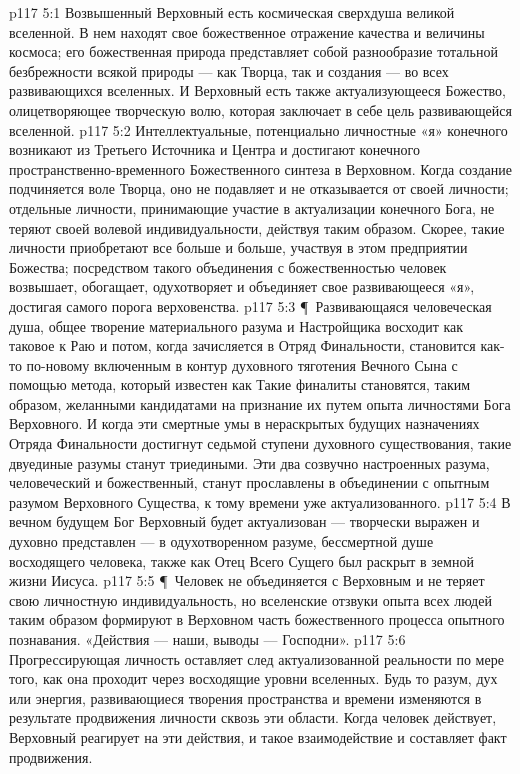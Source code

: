 \vs p117 5:1 Возвышенный Верховный есть космическая сверхдуша великой вселенной. В нем находят свое божественное отражение качества и величины космоса; его божественная природа представляет собой разнообразие тотальной безбрежности всякой природы --- как Творца, так и создания --- во всех развивающихся вселенных. И Верховный есть также актуализующееся Божество, олицетворяющее творческую волю, которая заключает в себе цель развивающейся вселенной.
\vs p117 5:2 Интеллектуальные, потенциально личностные «я» конечного возникают из Третьего Источника и Центра и достигают конечного пространственно\hyp{}временного Божественного синтеза в Верховном. Когда создание подчиняется воле Творца, оно не подавляет и не отказывается от своей личности; отдельные личности, принимающие участие в актуализации конечного Бога, не теряют своей волевой индивидуальности, действуя таким образом. Скорее, такие личности приобретают все больше и больше, участвуя в этом предприятии Божества; посредством такого объединения с божественностью человек возвышает, обогащает, одухотворяет и объединяет свое развивающееся «я», достигая самого порога верховенства.
\vs p117 5:3 \P\ Развивающаяся человеческая душа, общее творение материального разума и Настройщика восходит как таковое к Раю и потом, когда зачисляется в Отряд Финальности, становится как\hyp{}то по\hyp{}новому включенным в контур духовного тяготения Вечного Сына с помощью метода, который известен как  Такие финалиты становятся, таким образом, желанными кандидатами на признание их путем опыта личностями Бога Верховного. И когда эти смертные умы в нераскрытых будущих назначениях Отряда Финальности достигнут седьмой ступени духовного существования, такие двуединые разумы станут триедиными. Эти два созвучно настроенных разума, человеческий и божественный, станут прославлены в объединении с опытным разумом Верховного Существа, к тому времени уже актуализованного.
\vs p117 5:4 В вечном будущем Бог Верховный будет актуализован --- творчески выражен и духовно представлен --- в одухотворенном разуме, бессмертной душе восходящего человека, также как Отец Всего Сущего был раскрыт в земной жизни Иисуса.
\vs p117 5:5 \P\ Человек не объединяется с Верховным и не теряет свою личностную индивидуальность, но вселенские отзвуки опыта всех людей таким образом формируют в Верховном часть божественного процесса опытного познавания. «Действия --- наши, выводы --- Господни».
\vs p117 5:6 Прогрессирующая личность оставляет след актуализованной реальности по мере того, как она проходит через восходящие уровни вселенных. Будь то разум, дух или энергия, развивающиеся творения пространства и времени изменяются в результате продвижения личности сквозь эти области. Когда человек действует, Верховный реагирует на эти действия, и такое взаимодействие и составляет факт продвижения.
